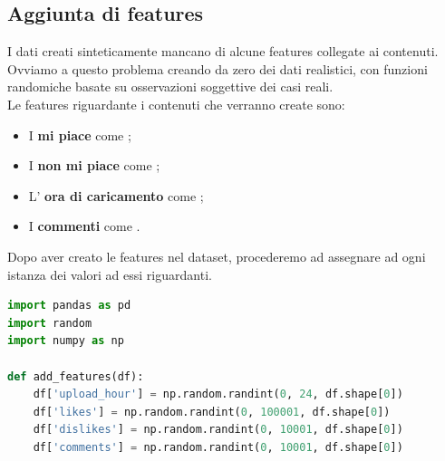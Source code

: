 \documentclass[a4paper,12pt]{report}
\begin{document}
\subsection{Aggiunta di features}
I dati creati sinteticamente mancano di alcune features collegate ai contenuti.\\
Ovviamo a questo problema creando da zero dei dati realistici, con funzioni randomiche basate su osservazioni soggettive dei casi reali.\\
Le features riguardante i contenuti che verranno create sono:
\begin{itemize}
        \item I \textbf{mi piace} come \texttt{\color{red}{likes}};
        \item I \textbf{non mi piace} come \texttt{\color{red}{dislikes}};
        \item L' \textbf{ora di caricamento} come \texttt{\color{red}{upload\_hour}};
        \item I \textbf{commenti} come \texttt{\color{red}{comments}}.
\end{itemize}
Dopo aver creato le features nel dataset, procederemo ad assegnare ad ogni istanza dei valori ad essi riguardanti.\\

\begin{lstlisting}[language=Python]
import pandas as pd
import random
import numpy as np

def add_features(df):
    df['upload_hour'] = np.random.randint(0, 24, df.shape[0])
    df['likes'] = np.random.randint(0, 100001, df.shape[0])
    df['dislikes'] = np.random.randint(0, 10001, df.shape[0])
    df['comments'] = np.random.randint(0, 10001, df.shape[0])
\end{lstlisting}
\end{document}
